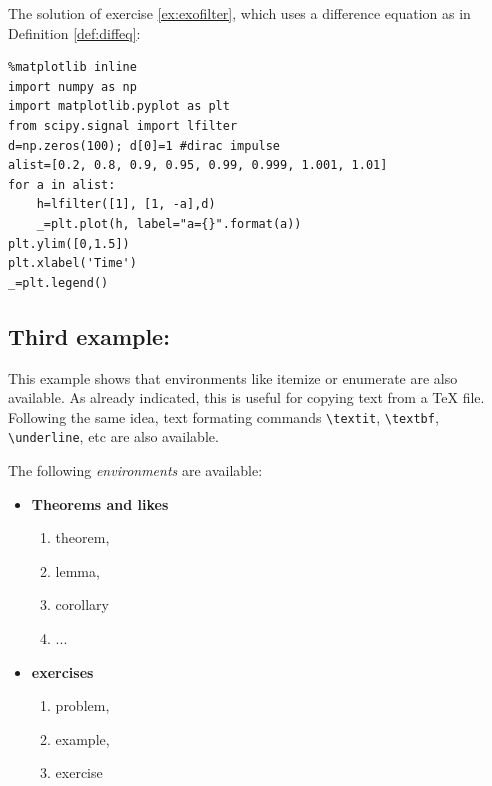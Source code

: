 The solution of exercise \ref{ex:exofilter}, which uses a difference
equation as in Definition \ref{def:diffeq}:
%
\begin{lstlisting}
%matplotlib inline
import numpy as np
import matplotlib.pyplot as plt 
from scipy.signal import lfilter
d=np.zeros(100); d[0]=1 #dirac impulse
alist=[0.2, 0.8, 0.9, 0.95, 0.99, 0.999, 1.001, 1.01]
for a in alist:
    h=lfilter([1], [1, -a],d)
    _=plt.plot(h, label="a={}".format(a))
plt.ylim([0,1.5])
plt.xlabel('Time')
_=plt.legend()
\end{lstlisting}%
    \begin{center}
    \end{center}
    
    \subsection{Third example:}\label{third-example}

    This example shows that environments like itemize or enumerate are also
available. As already indicated, this is useful for copying text from a
TeX file. Following the same idea, text formating commands
\texttt{\textbackslash{}textit}, \texttt{\textbackslash{}textbf},
\texttt{\textbackslash{}underline}, etc are also available.

    \begin{listing}
The following \textit{environments} are available:
\begin{itemize}
    \item \textbf{Theorems and likes}
    \begin{enumerate}
        \item theorem,
        \item lemma,
        \item corollary
        \item ...
    \end{enumerate}
    \item \textbf{exercises}
    \begin{enumerate}
        \item problem,
        \item example,
        \item exercise
    \end{enumerate}
\end{itemize}
\end{listing}

